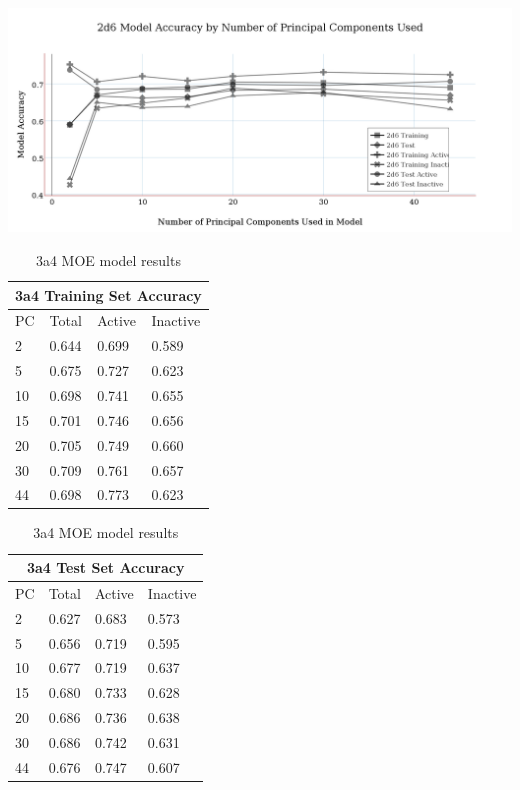 \includegraphics[width=1\textwidth]{../img/2d6_moe_model_accuracy.png}

\begin{table}[h]
\begin{minipage}{.5\linewidth}
\centering
\begin{tabular}{|l|l|l|l|}
\hline
\multicolumn{4}{|c|}{3a4 Training Set Accuracy} \\ \hline
PC & Total          & Active          & Inactive \\ \hline
2  & 0.644          & 0.699           & 0.589   \\ \hline
5  & 0.675          & 0.727           & 0.623   \\ \hline
10 & 0.698          & 0.741           & 0.655   \\ \hline
15 & 0.701          & 0.746           & 0.656   \\ \hline
20 & 0.705          & 0.749           & 0.660   \\ \hline
30 & 0.709          & 0.761           & 0.657   \\ \hline
44 & 0.698          & 0.773           & 0.623   \\ \hline
\end{tabular}
\end{minipage}
\begin{minipage}{.5\linewidth}
\centering
\begin{tabular}{|l|l|l|l|}
\hline
\multicolumn{4}{|c|}{3a4 Test Set Accuracy}      \\ \hline
PC & Total          & Active          & Inactive \\ \hline
2  & 0.627          & 0.683           & 0.573    \\ \hline
5  & 0.656          & 0.719           & 0.595    \\ \hline
10 & 0.677          & 0.719           & 0.637    \\ \hline
15 & 0.680          & 0.733           & 0.628    \\ \hline
20 & 0.686          & 0.736           & 0.638    \\ \hline
30 & 0.686          & 0.742           & 0.631    \\ \hline
44 & 0.676          & 0.747           & 0.607    \\ \hline
\end{tabular}
\end{minipage}
\caption{3a4 MOE model results}
\end{table}

